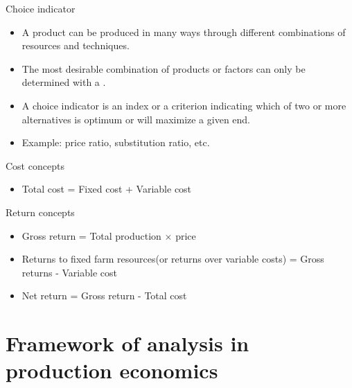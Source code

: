 \documentclass[12pt,ignorenonframetext,aspectratio=169]{beamer}
\providecommand{\tightlist}{%
  \setlength{\itemsep}{0pt}\setlength{\parskip}{0pt}}
\begin{document}
\begin{frame}{}
\protect\hypertarget{section-8}{}

\begin{block}{Choice indicator}

\begin{itemize}
\tightlist
\item
  A product can be produced in many ways through different combinations
  of resources and techniques.
\item
  The most desirable combination of products or factors can only be
  determined with a .
\item
  A choice indicator is an index or a criterion indicating which of two
  or more alternatives is optimum or will maximize a given end.
\item
  Example: price ratio, substitution ratio, etc.
\end{itemize}

\end{block}

\end{frame}

\begin{frame}{}
\protect\hypertarget{section-9}{}

\begin{block}{Cost concepts}

\begin{itemize}
\tightlist
\item
  Total cost = Fixed cost + Variable cost
\end{itemize}

\end{block}

\begin{block}{Return concepts}

\begin{itemize}
\tightlist
\item
  Gross return = Total production \(\times\) price
\item
  Returns to fixed farm resources(or returns over variable costs) =
  Gross returns - Variable cost
\item
  Net return = Gross return - Total cost
\end{itemize}

\end{block}

\end{frame}

\hypertarget{framework-of-analysis-in-production-economics}{%
\section{Framework of analysis in production
economics}\label{framework-of-analysis-in-production-economics}}
\end{document}
